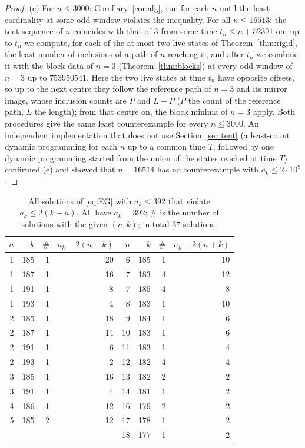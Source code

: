 \documentclass[11pt]{amsart}
\theoremstyle{definition}
\theoremstyle{remark}
\begin{document}
\begin{proof}
(e) For $n\le3000$: Corollary~\ref{cor:alg}, run for each $n$ until the least cardinality at some odd window violates the inequality. For all $n\le16513$: the tent sequence of $n$ coincides with that of $3$ from some time $t_n\le n+52301$ on; up to $t_n$ we compute, for each of the at most two live states of Theorem~\ref{thm:rigid}, the least number of inclusions of a path of $n$ reaching it, and after $t_n$ we combine it with the block data of $n=3$ (Theorem~\ref{thm:blocks}) at every odd window of $n=3$ up to $753950541$. Here the two live states at time $t_n$ have opposite offsets, so up to the next centre they follow the reference path of $n=3$ and its mirror image, whose inclusion counts are $P$ and $L-P$ ($P$ the count of the reference path, $L$ the length); from that centre on, the block minima of $n=3$ apply. Both procedures give the same least counterexample for every $n\le3000$. An independent implementation that does not use Section~\ref{sec:tent} (a least-count dynamic programming for each $n$ up to a common time $T$, followed by one dynamic programming started from the union of the states reached at time $T$) confirmed (e) and showed that $n=16514$ has no counterexample with $a_k\le2\cdot10^9$.
\end{proof}

\begin{table}[ht]
\centering\small
\begin{tabular}{r r r r @{\qquad} r r r r}
\toprule
$n$ & $k$ & $\#$ & $a_k-2(n+k)$ & $n$ & $k$ & $\#$ & $a_k-2(n+k)$\\
\midrule
1 & 185 & 1 & 20 & 6 & 185 & 1 & 10\\
1 & 187 & 1 & 16 & 7 & 183 & 4 & 12\\
1 & 191 & 1 & 8 & 7 & 185 & 4 & 8\\
1 & 193 & 1 & 4 & 8 & 183 & 1 & 10\\
2 & 185 & 1 & 18 & 9 & 184 & 1 & 6\\
2 & 187 & 1 & 14 & 10 & 183 & 1 & 6\\
2 & 191 & 1 & 6 & 11 & 183 & 1 & 4\\
2 & 193 & 1 & 2 & 12 & 182 & 4 & 4\\
3 & 185 & 1 & 16 & 13 & 182 & 2 & 2\\
3 & 191 & 1 & 4 & 14 & 181 & 1 & 2\\
4 & 186 & 1 & 12 & 16 & 179 & 2 & 2\\
5 & 185 & 2 & 12 & 17 & 178 & 1 & 2\\
  &     &   &    & 18 & 177 & 1 & 2\\
\bottomrule
\end{tabular}
\caption{All solutions of \eqref{eq:EG} with $a_k\le 392$ that violate $a_k\le 2(k+n)$. All have $a_k=392$; $\#$ is the number of solutions with the given $(n,k)$; in total $37$ solutions.}\label{tab:392}
\end{table}
\end{document}
